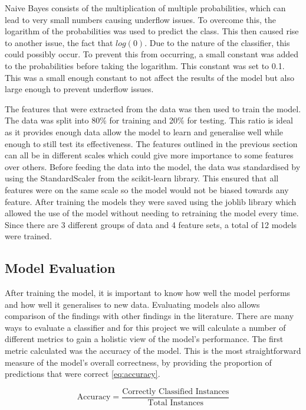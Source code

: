 Naive Bayes consists of the multiplication of multiple probabilities, which can lead to very small numbers causing underflow issues. To overcome this, the logarithm of the probabilities was used to predict the class. This then caused rise to another issue, the fact that $log(0)$. Due to the nature of the classifier, this could possibly occur. To prevent this from occurring, a small constant was added to the probabilities before taking the logarithm. This constant was set to 0.1. This was a small enough constant to not affect the results of the model but also large enough to prevent underflow issues.

The features that were extracted from the data was then used to train the model. The data was split into 80\% for training and 20\% for testing. This ratio is ideal as it provides enough data allow the model to learn and generalise well while enough to still test its effectiveness. The features outlined in the previous section can all be in different scales which could give more importance to some features over others. Before feeding the data into the model, the data was standardised by using the StandardScaler from the scikit-learn library.  This ensured that all features were on the same scale so the model would not be biased towards any feature. After training the models they were saved using the joblib library which allowed the use of the model without needing to retraining the model every time. Since there are 3 different groups of data and 4 feature sets, a total of 12 models were trained. 

\subsection {Model Evaluation}

After training the model, it is important to know how well the model performs and how well it generalises to new data. Evaluating models also allows comparison of the findings with other findings in the literature. There are many ways to evaluate a classifier and for this project we will calculate a number of different metrics to gain a holistic view of the model's performance. The first metric calculated was the accuracy of the model. This is the most straightforward measure of the model's overall correctness, by providing the proportion of predictions that were correct \ref{eq:accuracy}.


\begin{equation}
    \label{eq:accuracy}
    \text{Accuracy} = \frac{\text{Correctly Classified Instances}}{\text{Total Instances}}
\end{equation}

